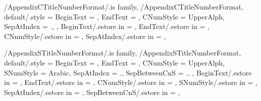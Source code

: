 
\pgfkeys
{
  /AppendixCTitleNumberFormat/.is family, /AppendixCTitleNumberFormat,
  default/.style =
  {
    BeginText = \empty,
    EndText = \empty,
    CNumStyle = UpperAlph,
    SepAtIndex = {.},
  },
  BeginText/.estore in = \GetAppendixCTitleNumberFormatBeginText,
  EndText/.estore in = \GetAppendixCTitleNumberFormatEndText,
  CNumStyle/.estore in = \GetAppendixCTitleNumberFormatCNumStyle,
  SepAtIndex/.estore in = \GetAppendixCTitleNumberFormatSepAtIndex,
} %

\newcommand\GetAppendixChapterTitleNumberFormatString{}
\newcommand\SetupAppendixChapterTitleNumberFormatString
{%
  \SetupTitleNumberFormatString{AppendixChapter}%
  {%
    BeginText=\GetAppendixCTitleNumberFormatBeginText,%
    EndText=\GetAppendixCTitleNumberFormatEndText,%
    CNumStyle=\GetAppendixCTitleNumberFormatCNumStyle,%
    CCounterName=appendixchapter,%
  }{\GetAppendixChapterTitleNumberFormatString}%
} %


\pgfkeys
{
  /AppendixSTitleNumberFormat/.is family, /AppendixSTitleNumberFormat,
  default/.style =
  {
    BeginText = \empty,
    EndText = \empty,
    CNumStyle = UpperAlph,
    SNumStyle = Arabic,
    SepAtIndex = {.}, %
    SepBetweenCnS = {.}, %
  },
  BeginText/.estore in = \GetAppendixSTitleNumberFormatBeginText,
  EndText/.estore in = \GetAppendixSTitleNumberFormatEndText,
  CNumStyle/.estore in = \GetAppendixSTitleNumberFormatCNumStyle,
  SNumStyle/.estore in = \GetAppendixSTitleNumberFormatSNumStyle,
  SepAtIndex/.estore in = \GetAppendixSTitleNumberFormatSepAtIndex,
  SepBetweenCnS/.estore in = \GetAppendixSTitleNumberFormatSepBetweenCnS,
} %

\newcommand\GetAppendixSectionTitleNumberFormatString{}
\newcommand\SetupAppendixSectionTitleNumberFormatString
{%
  \SetupTitleNumberFormatString{AppendixSection}%
  {%
    BeginText=\GetAppendixSTitleNumberFormatBeginText,%
    EndText=\GetAppendixSTitleNumberFormatEndText,%
    CNumStyle=\GetAppendixSTitleNumberFormatCNumStyle,%
    SNumStyle=\GetAppendixSTitleNumberFormatSNumStyle,%
    SepAtIndex=\GetAppendixSTitleNumberFormatSepAtIndex,%
    SepBetweenCnS=\GetAppendixSTitleNumberFormatSepBetweenCnS,%
    CCounterName=appendixchapter,%
    SCounterName=appendixsection,%
  }{\GetAppendixSectionTitleNumberFormatString}%
} %

